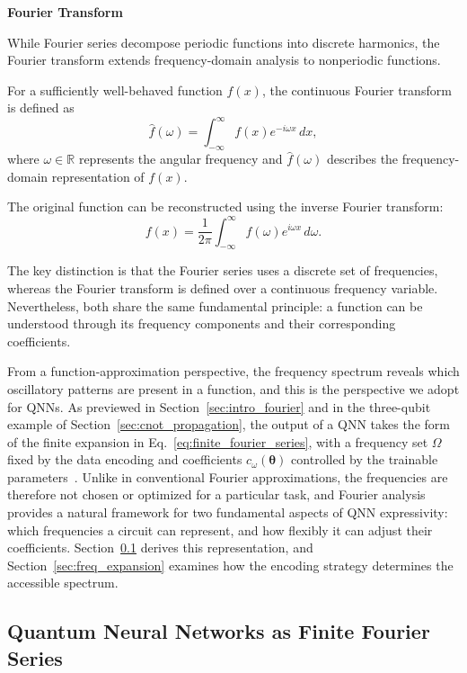 \documentclass[12pt]{article}
\numberwithin{equation}{section}  %
\begin{document}
\textbf{Fourier Transform}

While Fourier series decompose periodic functions into discrete harmonics, the Fourier transform extends frequency-domain analysis to nonperiodic functions.

For a sufficiently well-behaved function $f(x)$, the continuous Fourier transform is defined as
\begin{equation}
    \hat{f}(\omega)
    =\int_{-\infty}^{\infty}
    f(x)e^{-i\omega x}\,dx,
    \label{eq:fourier_transform}
\end{equation}
where $\omega\in\mathbb{R}$ represents the angular frequency and $\hat{f}(\omega)$ describes the frequency-domain representation of $f(x)$.

The original function can be reconstructed using the inverse Fourier transform:
\begin{equation}
    f(x)=\frac{1}{2\pi}
    \int_{-\infty}^{\infty}
    \hat{f}(\omega)e^{i\omega x}\,d\omega.
    \label{eq:inverse_fourier_transform}
\end{equation}

The key distinction is that the Fourier series uses a discrete set of frequencies, whereas the Fourier transform is defined over a continuous frequency variable. Nevertheless, both share the same fundamental principle: a function can be understood through its frequency components and their corresponding coefficients.

From a function-approximation perspective, the frequency spectrum reveals which oscillatory patterns are present in a function, and this is the perspective we adopt for QNNs. As previewed in Section~\ref{sec:intro_fourier} and in the three-qubit example of Section~\ref{sec:cnot_propagation}, the output of a QNN takes the form of the finite expansion in Eq.~\eqref{eq:finite_fourier_series}, with a frequency set $\Omega$ fixed by the data encoding and coefficients $c_\omega(\boldsymbol{\theta})$ controlled by the trainable parameters~\cite{schuld2021effect}. Unlike in conventional Fourier approximations, the frequencies are therefore not chosen or optimized for a particular task, and Fourier analysis provides a natural framework for two fundamental aspects of QNN expressivity: which frequencies a circuit can represent, and how flexibly it can adjust their coefficients. Section~\ref{sec:qnn_finite_fourier} derives this representation, and Section~\ref{sec:freq_expansion} examines how the encoding strategy determines the accessible spectrum.

\subsection{Quantum Neural Networks as Finite Fourier Series}
\label{sec:qnn_finite_fourier}
\end{document}
